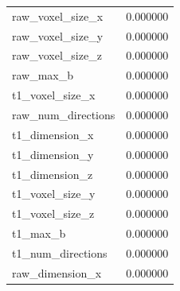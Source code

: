 \documentclass[9pt,lineno]{elife}
\begin{document}
\begin{appendixbox}
\begin{multicols}{2}
{\begin{tabular}{|lr}
raw\_voxel\_size\_x      &                  0.000000 \\
raw\_voxel\_size\_y      &                  0.000000 \\
raw\_voxel\_size\_z      &                  0.000000 \\
raw\_max\_b             &                  0.000000 \\
t1\_voxel\_size\_x       &                  0.000000 \\
raw\_num\_directions    &                  0.000000 \\
t1\_dimension\_x        &                  0.000000 \\
t1\_dimension\_y        &                  0.000000 \\
t1\_dimension\_z        &                  0.000000 \\
t1\_voxel\_size\_y       &                  0.000000 \\
t1\_voxel\_size\_z       &                  0.000000 \\
t1\_max\_b              &                  0.000000 \\
t1\_num\_directions     &                  0.000000 \\
raw\_dimension\_x       &                  0.000000 \\
\bottomrule
\end{tabular}
}
\end{multicols}
\end{appendixbox}
\end{document}

